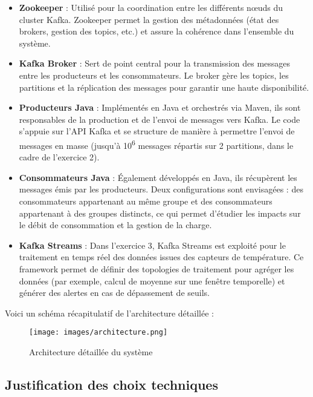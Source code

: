 \begin{itemize}
    \item \textbf{Zookeeper} : Utilisé pour la coordination entre les différents nœuds du cluster Kafka.
    Zookeeper permet la gestion des métadonnées (état des brokers, gestion des topics, etc.) et assure la cohérence dans l’ensemble du système.
    \item \textbf{Kafka Broker} : Sert de point central pour la transmission des messages entre les producteurs et les consommateurs.
    Le broker gère les topics, les partitions et la réplication des messages pour garantir une haute disponibilité.
    \item \textbf{Producteurs Java} : Implémentés en Java et orchestrés via Maven, ils sont responsables de la production et de l’envoi de messages vers Kafka.
    Le code s’appuie sur l’API Kafka et se structure de manière à permettre l’envoi de messages en masse (jusqu’à 10\textsuperscript{6} messages répartis sur 2 partitions, dans le cadre de l’exercice 2).
    \item \textbf{Consommateurs Java} : Également développés en Java, ils récupèrent les messages émis par les producteurs.
    Deux configurations sont envisagées : des consommateurs appartenant au même groupe et des consommateurs appartenant à des groupes distincts, ce qui permet d’étudier les impacts sur le débit de consommation et la gestion de la charge.
    \item \textbf{Kafka Streams} : Dans l’exercice 3, Kafka Streams est exploité pour le traitement en temps réel des données issues des capteurs de température.
    Ce framework permet de définir des topologies de traitement pour agréger les données (par exemple, calcul de moyenne sur une fenêtre temporelle) et générer des alertes en cas de dépassement de seuils.
\end{itemize}

Voici un schéma récapitulatif de l’architecture détaillée :

\begin{figure}[H]
    \centering
    \texttt{[image: images/architecture.png]}
    \caption{Architecture détaillée du système}
\end{figure}

\subsection{Justification des choix techniques}\label{subsec:justification-des-choix-techniques}

